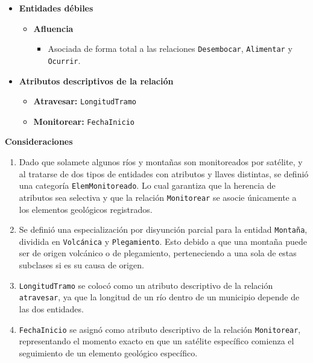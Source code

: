\begin{itemize}
\begin{itemize}
        \item \textbf{Satélite}
        \begin{itemize}
            \item \underline{{IdSatelite}} 
            \item Nombre
            \item Descripcion
        \end{itemize}
    \end{itemize}

    \item \textbf{Entidades débiles}
    \begin{itemize}
        \item \textbf{Afluencia}
        \begin{itemize}
            \item Asociada de forma total a las relaciones \texttt{Desembocar}, \texttt{Alimentar} y \texttt{Ocurrir}.
        \end{itemize}
    \end{itemize}

    \item \textbf{Atributos descriptivos de la relación}
    \begin{itemize}
        \item \textbf{Atravesar:} \texttt{LongitudTramo}
        \item \textbf{Monitorear:} \texttt{FechaInicio}
    \end{itemize}
\end{itemize}

\textbf{Consideraciones}
\begin{enumerate}
    \item Dado que solamete algunos ríos y montañas son monitoreados por satélite, y al tratarse de dos tipos de entidades con atributos y llaves distintas, se definió una categoría \texttt{ElemMonitoreado}. Lo cual garantiza que la herencia de atributos sea selectiva y que la relación \texttt{Monitorear} se asocie únicamente a los elementos geológicos registrados.
    
    \item Se definió una especialización por disyunción parcial para la entidad \texttt{Montaña}, dividida en \texttt{Volcánica} y \texttt{Plegamiento}. Esto debido a que una montaña puede ser de origen volcánico o de plegamiento, perteneciendo a una sola de estas subclases si es su causa de origen.

    \item \texttt{LongitudTramo} se colocó como un atributo descriptivo de la relación \texttt{atravesar}, ya que la longitud de un río dentro de un municipio depende de las dos entidades.
    
    \item \texttt{FechaInicio} se asignó como atributo descriptivo de la relación \texttt{Monitorear}, representando el momento exacto en que un satélite específico comienza el seguimiento de un elemento geológico específico.
\end{enumerate}

